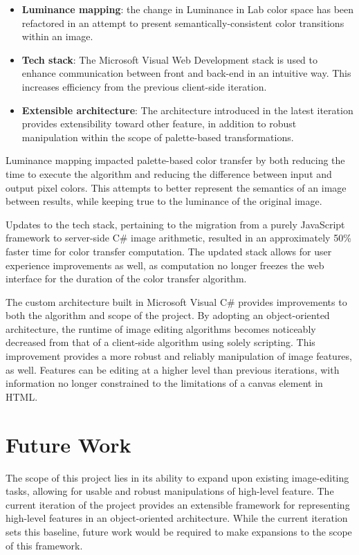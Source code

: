 \documentclass[sigchi]{acmart}
\begin{document}
\begin{itemize}
	\item{\textbf{Luminance mapping}}: the change in Luminance in Lab color space has been refactored in an attempt to present semantically-consistent color transitions within an image.
	\item{\textbf{Tech stack}}: The Microsoft Visual Web Development stack is used to enhance communication between front and back-end in an intuitive way. This increases efficiency from the previous client-side iteration.
	\item{\textbf{Extensible architecture}}: The architecture introduced in the latest iteration provides extensibility toward other feature, in addition to robust manipulation within the scope of palette-based transformations.
\end{itemize}

Luminance mapping impacted palette-based color transfer by both reducing the time to execute the algorithm and reducing the difference between input and output pixel colors. This attempts to better represent the semantics of an image between results, while keeping true to the luminance of the original image. 

Updates to the tech stack, pertaining to the migration from a purely JavaScript framework to server-side C\# image arithmetic, resulted in an approximately 50\% faster time for color transfer computation. The updated stack allows for user experience improvements as well, as computation no longer freezes the web interface for the duration of the color transfer algorithm.

The custom architecture built in Microsoft Visual C\# provides improvements to both the algorithm and scope of the project. By adopting an object-oriented architecture, the runtime of image editing algorithms becomes noticeably decreased from that of a client-side algorithm using solely scripting. This improvement provides a more robust and reliably manipulation of image features, as well. Features can be editing at a higher level than previous iterations, with information no longer constrained to the limitations of a canvas element in HTML.

\section{Future Work}

The scope of this project lies in its ability to expand upon existing image-editing tasks, allowing for usable and robust manipulations of high-level feature. The current iteration of the project provides an extensible framework for representing high-level features in an object-oriented architecture. While the current iteration sets this baseline, future work would be required to make expansions to the scope of this framework.
\end{document}
